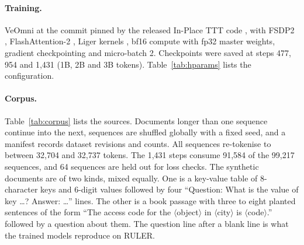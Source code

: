 \documentclass{article}
\begin{document}
\paragraph{Training.} VeOmni \citep{ma2025veomni} at the commit pinned by the released In-Place TTT code \citep{inplacettt_code}, with FSDP2 \citep{zhao2023fsdp}, FlashAttention-2 \citep{dao2023flashattention2}, Liger kernels \citep{hsu2024liger}, bf16 compute with fp32 master weights, gradient checkpointing and micro-batch 2. Checkpoints were saved at steps 477, 954 and 1,431 (1B, 2B and 3B tokens). Table~\ref{tab:hparams} lists the configuration.

\begin{table}[H]
\caption{Training configuration (identical for both arms except \texttt{ttt\_mode}).}
\label{tab:hparams}
\centering
\footnotesize
{}
\end{table}

\paragraph{Corpus.} Table~\ref{tab:corpus} lists the sources. Documents longer than one sequence continue into the next, sequences are shuffled globally with a fixed seed, and a manifest records dataset revisions and counts. All sequences re-tokenise to between 32,704 and 32,737 tokens. The 1,431 steps consume 91,584 of the 99,217 sequences, and 64 sequences are held out for loss checks. The synthetic documents are of two kinds, mixed equally. One is a key-value table of 8-character keys and 6-digit values followed by four ``Question: What is the value of key \dots? Answer: \dots'' lines. The other is a book passage with three to eight planted sentences of the form ``The access code for the $\langle$object$\rangle$ in $\langle$city$\rangle$ is $\langle$code$\rangle$.'' followed by a question about them. The question line after a blank line is what the trained models reproduce on RULER.
\end{document}
